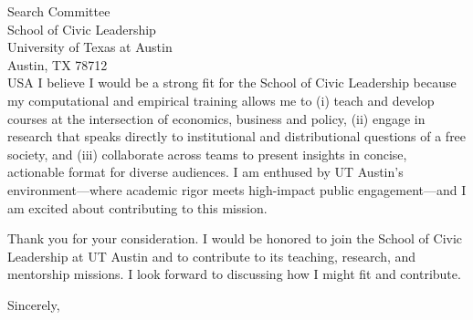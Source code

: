 \documentclass[11pt,letterpaper]{letter}
\begin{document}
\begin{letter}{Search Committee \\
School of Civic Leadership \\
University of Texas at Austin \\
Austin, TX 78712 \\ USA}
I believe I would be a strong fit for the School of Civic Leadership because my computational and empirical training allows me to (i) teach and develop courses at the intersection of economics, business and policy, (ii) engage in research that speaks directly to institutional and distributional questions of a free society, and (iii) collaborate across teams to present insights in concise, actionable format for diverse audiences. I am enthused by UT Austin’s environment—where academic rigor meets high-impact public engagement—and I am excited about contributing to this mission.

Thank you for your consideration. I would be honored to join the School of Civic Leadership at UT Austin and to contribute to its teaching, research, and mentorship missions. I look forward to discussing how I might fit and contribute.

\closing{Sincerely,}

\end{letter}
\end{document}
